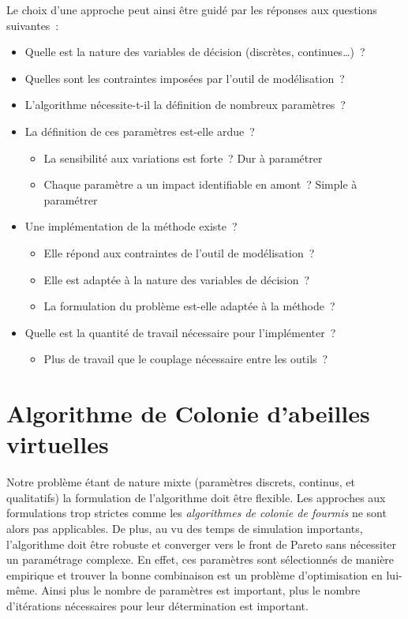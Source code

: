 {
\noindent
Le choix d’une approche peut ainsi être guidé par les réponses aux questions
suivantes~:
\begin{itemize}
  \item Quelle est la nature des variables de décision (discrètes, continues\dots)~?
  \item Quelles sont les contraintes imposées par l’outil de modélisation~?
  \item L’algorithme nécessite-t-il la définition de nombreux paramètres~?
  \item La définition de ces paramètres est-elle ardue~?
    \begin{itemize}
      \item La sensibilité aux variations est forte~? Dur à paramétrer
      \item Chaque paramètre a un impact identifiable en amont~? Simple à paramétrer
    \end{itemize}
  \item Une implémentation de la méthode existe~?
    \begin{itemize}
      \item Elle répond aux contraintes de l’outil de modélisation~?
      \item Elle est adaptée à la nature des variables de décision~?
      \item La formulation du problème est-elle adaptée à la méthode~?
    \end{itemize}
  \item Quelle est la quantité de travail nécessaire pour l’implémenter~?
    \begin{itemize}
      \item Plus de travail que le couplage nécessaire entre les outils~?
    \end{itemize}
\end{itemize}
}




\section{Algorithme de Colonie d’abeilles virtuelles} %
\label{sec:algorithme_de_colonie_d_abeilles_virtuelles}
Notre problème étant de nature mixte (paramètres discrets, continus, et
qualitatifs) la formulation de l’algorithme doit être flexible. Les approches
aux formulations trop strictes comme les \textit{algorithmes de colonie de
fourmis} ne sont alors pas applicables. De plus, au vu des temps de simulation
importants, l’algorithme doit être robuste et converger vers le front de Pareto
sans nécessiter un paramétrage complexe. En effet, ces paramètres sont
sélectionnés de manière empirique et trouver la bonne combinaison est un
problème d’optimisation en lui-même. Ainsi plus le nombre de paramètres est important,
plus le nombre d’itérations nécessaires pour leur détermination est important.

